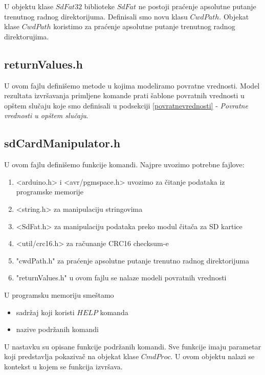 \documentclass[a4paper]{extarticle}
\begin{document}
	U objektu klase $SdFat32$ biblioteke $SdFat$ ne postoji praćenje apsolutne putanje trenutnog radnog direktorijuma. 
	Definisali smo novu klasu $CwdPath$. Objekat klase $CwdPath$ koristimo za praćenje apsolutne putanje trenutnog radnog direktorujima.
	
	\subsection{returnValues.h}
	
	U ovom fajlu definišemo metode u kojima modeliramo povratne vrednosti. 
	Model rezultata izvršavanja primljene komande prati šablone povratnih vrednosti u opštem slučaju koje smo definisali u podsekciji \ref{povratnevrednosti} -  \textit{Povratne vrednosti u opštem slučaju}.
	
	\subsection{sdCardManipulator.h}
	
	U ovom fajlu definišemo funkcije komandi.
	Najpre uvozimo potrebne fajlove:
	
	\begin{enumerate}
		\item <arduino.h> i <avr/pgmspace.h> uvozimo za čitanje podataka iz programske memorije
		\item <string.h> za manipulaciju stringovima
		\item <SdFat.h> za manipulaciju podataka preko modul čitača za SD kartice
 		\item <util/crc16.h> za računanje CRC16 checksum-e 
		\item "cwdPath.h" za praćenje apsolutne putanje trenutno radnog direktorijuma
		\item "returnValues.h" u ovom fajlu se nalaze modeli povratnih vrednosti
	\end{enumerate}

	U programsku memoriju smeštamo
	\begin{itemize}
		\item sadržaj koji koristi $HELP$ komanda  
		\item nazive podržanih komandi
	\end{itemize}

	U nastavku su opisane funkcije podržanih komandi. Sve funkcije imaju parametar koji predstavlja pokazivač na objekat klase $CmdProc$. U ovom objektu nalazi se kontekst u kojem se funkcija izvršava. 
	
\end{document}
